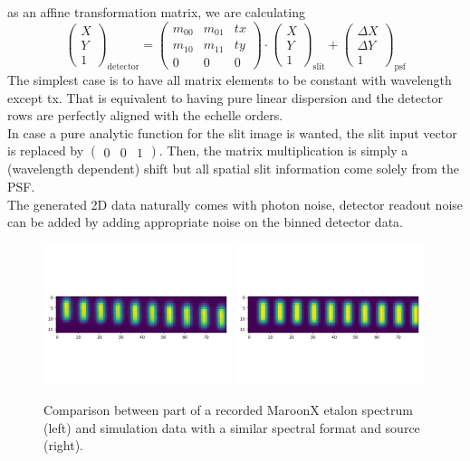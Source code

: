 \documentclass[modern]{aastex61}
\begin{document}
as an affine transformation matrix, we are calculating
\begin{equation}
    \begin{pmatrix} X \\ Y \\ 1 \end{pmatrix}_{\text{detector}} =
    \begin{pmatrix} m_{00} & m_{01} & tx \\ m_{10} & m_{11} & ty \\ 0 & 0 & 0 \end{pmatrix} \cdot
    \begin{pmatrix} X \\ Y \\ 1 \end{pmatrix}_{\text{slit}} +
    \begin{pmatrix} \Delta X \\ \Delta Y \\ 1 \end{pmatrix}_{\text{psf}}
\end{equation}
The simplest case is to have all matrix elements to be constant with wavelength except tx. That is equivalent to having pure linear dispersion and the detector rows
are perfectly aligned with the echelle orders.\\
In case a pure analytic function for the slit image is wanted, the slit input vector is replaced by $\begin{pmatrix} 0 & 0 & 1 \end{pmatrix}$. 
Then, the matrix multiplication is simply a (wavelength dependent) shift but all spatial slit information come solely from the PSF.\\
The generated 2D data naturally comes with photon noise, detector readout noise can be added by adding appropriate noise on the binned detector data.
\begin{figure}
    \includegraphics[width=0.49\textwidth]{img/maroonx_data.png}
    \includegraphics[width=0.49\textwidth]{img/simulator_data.png}
    \caption{Comparison between part of a recorded MaroonX etalon spectrum (left) and simulation data with a similar spectral format and source (right).}
\end{figure}
\end{document}
